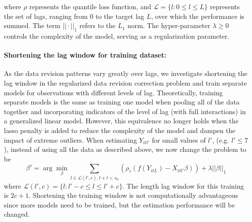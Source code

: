 where $\rho$ represents the quantile loss function\cite{Koenker1978}, and $\mathcal{L} = \{l: 0 \leq l \leq L\}$ represents the set of lags, ranging from 0 to the target lag $L$, over which the performance is summed. The term $||\cdot||_1$ refers to the $L_1$ norm. The hyper-parameter $\lambda \geq 0$ controls the complexity of the model, serving as a regularization parameter. 


\paragraph{Shortening the lag window for training dataset: }
As the data revision patterns vary greatly over lags, we investigate shortening the lag window in the regularized data revision correction problem and train separate models for observations with different levels of lag. Theoretically, training separate models is the same as training one model when pooling all of the data together and incorporating indicators of the level of lag (with full interactions) in a generalized linear model. However, this equivalence no longer holds when the lasso penalty is added to reduce the complexity of the model and dampen the impact of extreme outliers. When estimating  $Y_{itl'}$ for small values of $l'$, (e.g. $l' \leq 7$), instead of using all the data as described above, we now change the problem to be
$$ \beta^{\tau} = \arg\min_{\beta} \sum_{l\in \mathcal{L}(l',c) , t+l < s_0}(\rho_\tau (f(Y_{itL}) - X_{itl'}\beta)) + \lambda ||\beta||_1$$
where $\mathcal{L}(l', c) = \{l: l'-c \leq l \leq l'+ c\}$. The length lag window for this training is $2c +1$. Shortening the training window is not computationally advantageous since more models need to be trained, but the estimation performance will be changed.

